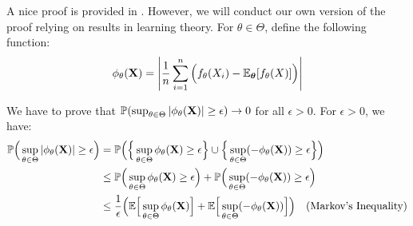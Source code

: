 \begin{proof*}
    A nice proof is provided in \cite[Theorem 16, Page 111]{book:ferguson1996}. However, we will conduct our own version of the proof relying on results in learning theory. For $\theta\in\Theta$, define the following function:
    \begin{equation}
        \phi_\theta({\bf X}) = \Bigg| 
            \frac{1}{n}\sum_{i=1}^n \Big( f_\theta(X_i) - \mathbb{E}_{\boldsymbol{\theta}}[f_\theta(X)] \Big)
         \Bigg| 
    \end{equation}

    \noindent We have to prove that $\mathbb{P}(\sup_{\theta\in\Theta}|\phi_\theta({\bf X})|\ge \epsilon)\to 0$ for all $\epsilon>0$. For $\epsilon>0$, we have:
    \begin{align*}
        \mathbb{P}\Big( \sup_{\theta\in\Theta}|\phi_\theta({\bf X})| \ge \epsilon \Big) 
        &= \mathbb{P}\Big( \Big\{ \sup_{\theta\in\Theta} \phi_\theta({\bf X}) \ge \epsilon \Big\}\cup\Big\{ \sup_{\theta\in\Theta} (-\phi_\theta({\bf X})) \ge \epsilon \Big\} \Big) \\ 
        &\le \mathbb{P}\Big( \sup_{\theta\in\Theta} \phi_\theta({\bf X}) \ge \epsilon \Big) + \mathbb{P}\Big( \sup_{\theta\in\Theta} (-\phi_\theta({\bf X})) \ge \epsilon \Big) \\ 
        &\le \frac{1}{\epsilon}\Big( \mathbb{E}\Big[ \sup_{\theta\in\Theta}\phi_\theta({\bf X}) \Big] + \mathbb{E}\Big[ \sup_{\theta\in\Theta}(-\phi_\theta({\bf X})) \Big] \Big) \quad \text{(Markov's Inequality)}
    \end{align*} 


\end{proof*}
